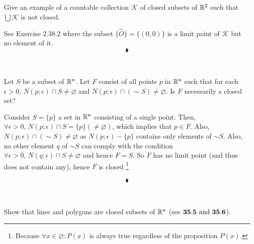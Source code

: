 \subsection{}
\begin{tcolorbox}
Give an example of a countable collection $\mathscr{K           }$ of closed subsets of $\mathbb{R}^2$ such that $\bigcup\mathscr{K}$ is not closed.
\end{tcolorbox}
See Exercise $\mathbf{2.38.2}$ where the subset $\{\hat{O}\}= \{(0,0)\}$ is a limit point of $\mathscr{K}$ but no element of it.
$$\blacklozenge$$\\

\subsection{}
\begin{tcolorbox}
Let $S$ be a subset of $\mathbb{R}^n$. Let $F$ consist of all points $p$ in $\mathbb{R}^n$ such that for each $\epsilon > 0, \, N(p; \epsilon)\cap S \neq \varnothing$ and $N(p;\epsilon)\cap \left(
\sim S\right)  \neq \varnothing$. Is $F$ necessarily a closed set?
\end{tcolorbox}
Consider $S=\{p\}$ a set in $\mathbb{R}^n$ consisting of a single point. Then, $\forall \epsilon > 0, \, N(p; \epsilon)\cap S = \{p\}(\neq \varnothing)$, which implies that $p\in F$. Also, $N(p;\epsilon)\cap \left(\sim S\right)\neq \varnothing$ as $N(p;\epsilon)-\{p\}$ contains only elements of $\sim S$. Also, no other element $q$ of $\sim S$ can comply with the condition $\forall \epsilon > 0, \, N(q; \epsilon)\cap S \neq \varnothing$ and hence $F=S$. So $F$ has no limit point (and thus does not contain any), hence $F$ is closed \footnote{Because $\forall x\in\varnothing:P(x)$ is always true regardless of the proposition $P(x)$.}

$$\blacklozenge$$\\

\subsection{}
\begin{tcolorbox}
Show that lines and polygons are closed subsets of $\mathbb{R}^n$ (see $\mathbf{35.5}\text{ and } \mathbf{ 35.6}$).
\end{tcolorbox}

